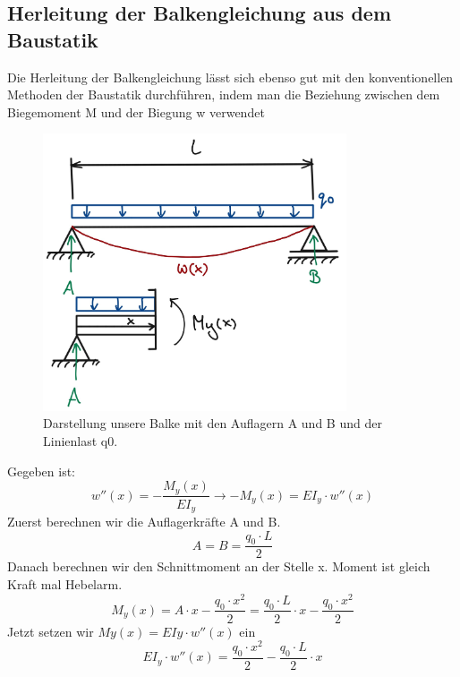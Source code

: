 \subsection{Herleitung der Balkengleichung aus dem Baustatik}
Die Herleitung der Balkengleichung lässt sich ebenso gut mit den konventionellen Methoden der Baustatik durchführen, indem man die Beziehung zwischen dem Biegemoment M und der Biegung w verwendet
\begin{figure}
\begin{center}
	\includegraphics[width=0.8\textwidth]{papers/balken/images/teil2/HerleitungBaustatik.jpg}
\end{center}
\caption{Darstellung unsere Balke mit den Auflagern A und B und der Linienlast q0.}
\end{figure}
Gegeben ist:
\begin{equation}
	w''(x)=
	-\frac{M_y(x)}{EI_y}
	\rightarrow-M_y(x)=
	EI_y\cdot w''(x)
\end{equation}
Zuerst berechnen wir die Auflagerkräfte A und B.
\begin{equation}
	A=
	B=
	\frac{q_0\cdot L}{2}
\end{equation}
Danach berechnen wir den Schnittmoment an der Stelle x.
Moment ist gleich Kraft mal Hebelarm.
\begin{equation}
	M_y(x)=
	A\cdot x-\frac{q_0\cdot x^2}{2}=
	\frac{q_0\cdot L}{2}\cdot x-\frac{q_0\cdot x^2}{2}
\end{equation}
Jetzt setzen wir $My(x) = EIy \cdot w''(x)$ ein
\begin{equation}
	EI_y\cdot w''(x)=
	\frac{q_0\cdot x^2}{2}-\frac{q_0\cdot L}{2}\cdot x
\end{equation}
